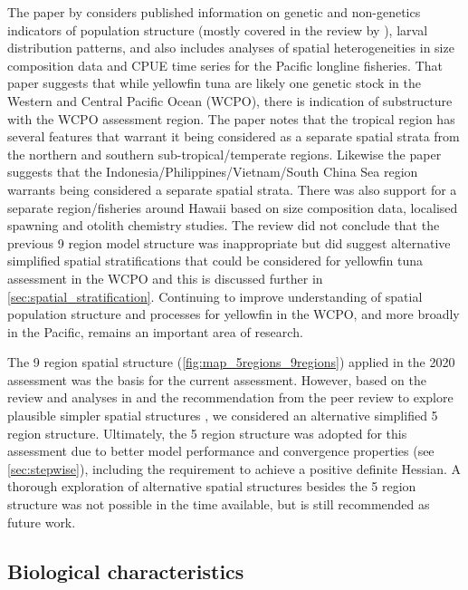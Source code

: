 The paper by \citet{hamer_review_2023} considers published information on genetic and non-genetics indicators of population structure (mostly covered in the review by \citet{moore_defining_2020}), larval distribution patterns, and also includes analyses of spatial heterogeneities in size composition data and CPUE time series for the Pacific longline fisheries. That paper suggests that while yellowfin tuna are likely one genetic stock in the Western and Central Pacific Ocean (WCPO), there is indication of substructure with the WCPO assessment region. The paper notes that the tropical region has several features that warrant it being considered as a separate spatial strata from the northern and southern sub-tropical/temperate regions. Likewise the paper suggests that the Indonesia/Philippines/Vietnam/South China Sea region warrants being considered a separate spatial strata. There was also support for a separate region/fisheries around Hawaii based on size composition data, localised spawning and otolith chemistry studies. The review did not conclude that the previous 9 region model structure was inappropriate but did suggest alternative simplified spatial stratifications that could be considered for yellowfin tuna assessment in the WCPO and this is discussed further in \autoref{sec:spatial_stratification}. Continuing to improve understanding of spatial population structure and processes for yellowfin in the WCPO, and more broadly in the Pacific, remains an important area of research.

The 9 region spatial structure (\autoref{fig:map_5regions_9regions}) applied in the 2020 assessment was the basis for the current assessment. However, based on the review and analyses in \citet{hamer_review_2023} and the recommendation from the peer review to explore plausible simpler spatial structures \citep{punt_independent_2023}, we considered an alternative simplified 5 region structure. Ultimately, the 5 region structure was adopted for this assessment due to better model performance and convergence properties (see \autoref{sec:stepwise}), including the requirement to achieve a positive definite Hessian. A thorough exploration of alternative spatial structures besides the 5 region structure was not possible in the time available, but is still recommended as future work.

\subsection{Biological characteristics}
\label{sec:biology}

